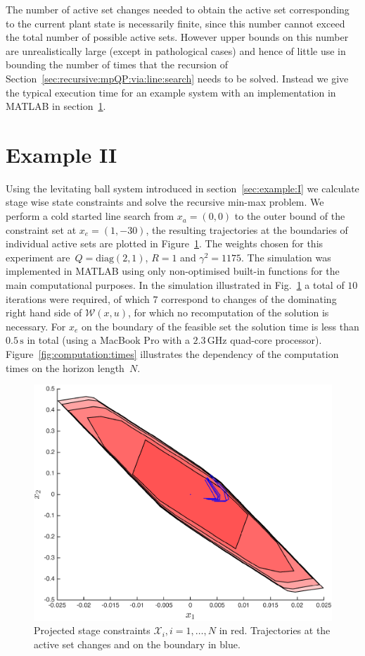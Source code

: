 \documentclass[journal]{IEEEtran}
\theoremstyle{remark}
\theoremstyle{definition}
\begin{document}
The number of active set changes needed to obtain the active set corresponding to the current plant state
is necessarily finite, since this number cannot exceed the total number of possible active sets. 
%
However upper bounds on this number are unrealistically large (except in pathological cases) and hence of 
little use in bounding the number of times that the recursion of Section~\ref{sec:recursive:mpQP:via:line:search} 
needs to be solved. 
%
Instead we give the typical execution time for an example system with an implementation in MATLAB  in 
section~\ref{sec:example:II}.
%


\section{Example II}\label{sec:example:II}

Using the levitating ball system introduced in section~\ref{sec:example:I} we calculate stage wise state constraints
and solve the recursive min-max problem.
%
We perform a cold started line search from $x_a=(0,0)$ to the outer bound of the constraint set at $x_e=(1,-30)$, 
the resulting trajectories at the boundaries of individual active sets are plotted in Figure~\ref{fig:plot}.
%
The weights chosen for this experiment are~$Q=\text{diag}(2,1)$, $R=1$ and $\gamma^2=1175$.
%
The simulation was implemented in MATLAB using only non-optimised built-in functions for the main computational
purposes. 
%
In the simulation illustrated in Fig.~\ref{fig:plot} a total of $10$ iterations were required,
of which $7$ correspond to changes of the dominating right hand side of $\mathcal W(x,u)$, for which no
recomputation of the solution is necessary.
%
For $x_e$ on the boundary of the feasible set the solution time is less than $0.5\, \text{s}$ in total 
(using a MacBook Pro with a $2.3\,\text{GHz}$ quad-core processor).
%
Figure~\ref{fig:computation:times} illustrates the dependency of the computation times on the horizon length~$N$.

\begin{figure}
\centering
\includegraphics[width=\columnwidth]{myplot}
\caption{Projected stage constraints $\mathcal X_i, i=1,\dots,N$ in red. Trajectories
at the active set changes and on the boundary in blue.}
\label{fig:plot}
\end{figure}
\end{document}
